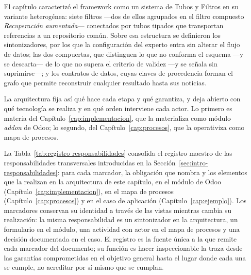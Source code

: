\documentclass[12pt]{report}
\begin{document}
El capítulo caracterizó el framework como un sistema de Tubos y Filtros en su variante heterogénea: siete filtros ---dos de ellos agrupados en el filtro compuesto \textit{Recuperación aumentada}--- conectados por tubos tipados que transportan referencias a un repositorio común. Sobre esa estructura se definieron los sintonizadores, por los que la configuración del experto entra sin alterar el flujo de datos; las dos compuertas, que distinguen lo que no conforma el esquema ---y se descarta--- de lo que no supera el criterio de validez ---y se señala sin suprimirse---; y los contratos de datos, cuyas claves de procedencia forman el grafo que permite reconstruir cualquier resultado hasta sus noticias.

La arquitectura fija así qué hace cada etapa y qué garantiza, y deja abierto con qué tecnología se realiza y en qué orden interviene cada actor. Lo primero es materia del Capítulo~\ref{cap:implementacion}, que la materializa como módulo \textit{addon} de Odoo; lo segundo, del Capítulo~\ref{cap:procesos}, que la operativiza como mapa de procesos.

La Tabla~\ref{tab:registro-responsabilidades} consolida el registro maestro de las responsabilidades transversales introducidas en la Sección~\ref{sec:intro-responsabilidades}: para cada marcador, la obligación que nombra y los elementos que la realizan en la arquitectura de este capítulo, en el módulo de Odoo (Capítulo~\ref{cap:implementacion}), en el mapa de procesos (Capítulo~\ref{cap:procesos}) y en el caso de aplicación (Capítulo~\ref{cap:ejemplo}). Los marcadores conservan su identidad a través de las vistas mientras cambia su realización: la misma responsabilidad es un sintonizador en la arquitectura, un formulario en el módulo, una actividad con actor en el mapa de procesos y una decisión documentada en el caso. El registro es la fuente única a la que remite cada marcador del documento; su función es hacer inspeccionable la traza desde las garantías comprometidas en el objetivo general hasta el lugar donde cada una se cumple, no acreditar por sí mismo que se cumplan.
\end{document}
